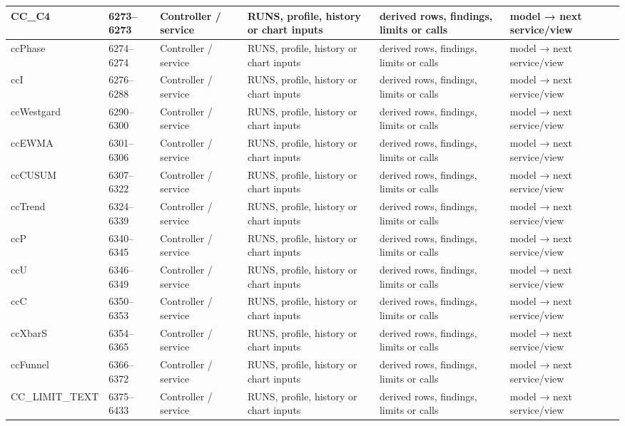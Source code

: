 \begin{landscape}
\begin{longtable}{@{}p{3.2cm}p{1.45cm}p{2.7cm}p{4.0cm}p{4.0cm}p{3.0cm}@{}}
CC\_C4 & 6273--6273 & Controller / service & RUNS, profile, history or chart inputs & derived rows, findings, limits or calls & model → next service/view \\\hline
ccPhase & 6274--6274 & Controller / service & RUNS, profile, history or chart inputs & derived rows, findings, limits or calls & model → next service/view \\\hline
ccI & 6276--6288 & Controller / service & RUNS, profile, history or chart inputs & derived rows, findings, limits or calls & model → next service/view \\\hline
ccWestgard & 6290--6300 & Controller / service & RUNS, profile, history or chart inputs & derived rows, findings, limits or calls & model → next service/view \\\hline
ccEWMA & 6301--6306 & Controller / service & RUNS, profile, history or chart inputs & derived rows, findings, limits or calls & model → next service/view \\\hline
ccCUSUM & 6307--6322 & Controller / service & RUNS, profile, history or chart inputs & derived rows, findings, limits or calls & model → next service/view \\\hline
ccTrend & 6324--6339 & Controller / service & RUNS, profile, history or chart inputs & derived rows, findings, limits or calls & model → next service/view \\\hline
ccP & 6340--6345 & Controller / service & RUNS, profile, history or chart inputs & derived rows, findings, limits or calls & model → next service/view \\\hline
ccU & 6346--6349 & Controller / service & RUNS, profile, history or chart inputs & derived rows, findings, limits or calls & model → next service/view \\\hline
ccC & 6350--6353 & Controller / service & RUNS, profile, history or chart inputs & derived rows, findings, limits or calls & model → next service/view \\\hline
ccXbarS & 6354--6365 & Controller / service & RUNS, profile, history or chart inputs & derived rows, findings, limits or calls & model → next service/view \\\hline
ccFunnel & 6366--6372 & Controller / service & RUNS, profile, history or chart inputs & derived rows, findings, limits or calls & model → next service/view \\\hline
CC\_LIMIT\_TEXT & 6375--6433 & Controller / service & RUNS, profile, history or chart inputs & derived rows, findings, limits or calls & model → next service/view \\\hline

\end{longtable}
\end{landscape}
